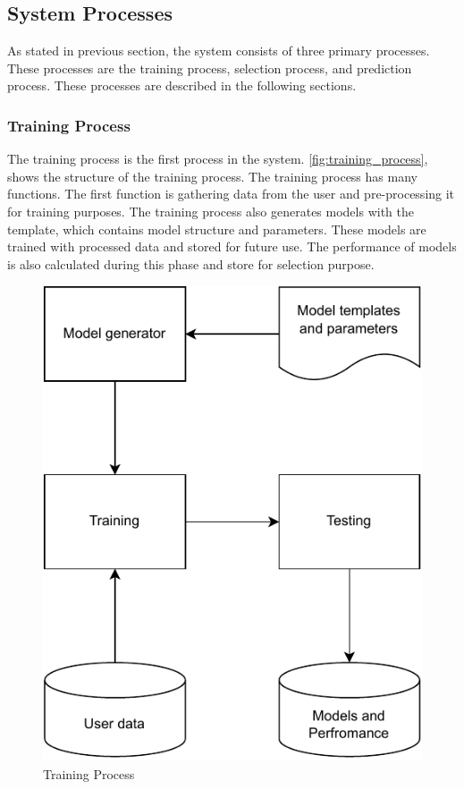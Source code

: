 \subsection{System Processes}\label{subsec:system_processes}

As stated in previous section, the system consists of three primary processes. These processes are the training process, selection process, and prediction process. These processes are described in the following sections.

\subsubsection{Training Process}\label{subsubsec:training_process}

The training process is the first process in the system. \autoref{fig:training_process}, shows the structure of the training process. The training process has many functions. The first function is gathering data from the user and pre-processing it for training purposes. The training process also generates models with the template, which contains model structure and parameters. These models are trained with processed data and stored for future use. The performance of models is also calculated during this phase and store for selection purpose.

\begin{figure}[ht]
    \centering
    \includegraphics[width=0.6\columnwidth]{media/sec03/training_and_testing.pdf}
    \caption{Training Process}
    \label{fig:training_process}
\end{figure}

